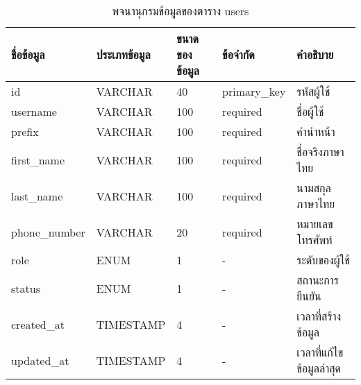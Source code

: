 \begin{table}[htbp]
    \caption{พจนานุกรมข้อมูลของตาราง users}
    \label{tab:database-users}
    \begin{tabularx}{\textwidth}{ | p{2.25cm} | p{2.20cm} | p{2.45cm} | p{2cm} | X | }
    \hline
    \textbf{ชื่อข้อมูล} & \textbf{ประเภทข้อมูล} & \textbf{ขนาดของข้อมูล} & \textbf{ข้อจำกัด} & \textbf{คำอธิบาย} \\
    \hline
    id & VARCHAR & 40 & primary\_key & รหัสผู้ใช้ \\
    \hline
    username & VARCHAR & 100 & required & ชื่อผู้ใช้ \\
    \hline
    prefix & VARCHAR & 100 & required & คำนำหน้า \\
    \hline
    first\_name & VARCHAR & 100 & required & ชื่อจริงภาษาไทย \\
    \hline
    last\_name & VARCHAR & 100 & required & นามสกุลภาษาไทย \\
    \hline
    phone\_number & VARCHAR & 20 & required & หมายเลขโทรศัพท์ \\
    \hline
    role & ENUM & 1 & - & ระดับของผู้ใช้ \\
    \hline
    status & ENUM & 1 & - & สถานะการยืนยัน \\
    \hline
    created\_at & TIMESTAMP & 4 & - & เวลาที่สร้างข้อมูล \\
    \hline
    updated\_at & TIMESTAMP & 4 & - & เวลาที่แก้ไขข้อมูลล่าสุด \\
    \hline
    \end{tabularx}
\end{table}

